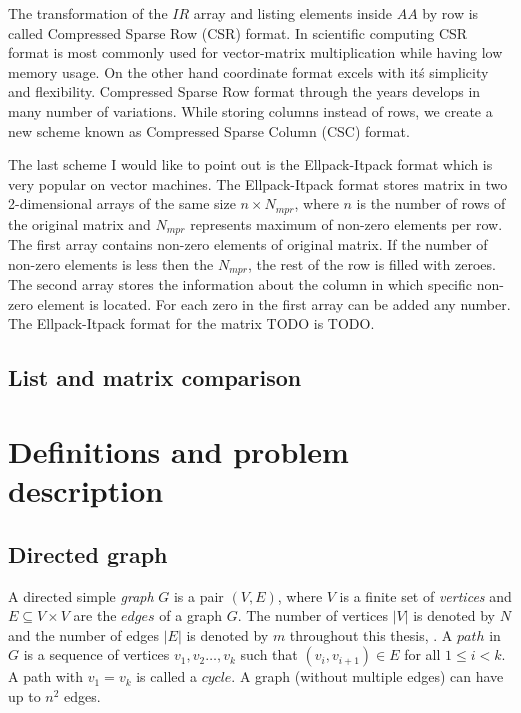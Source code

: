 \documentclass[thesis=M,english]{FITthesis}[2012/10/20]
\begin{document}
The transformation of the $IR$ array and listing elements inside $AA$ by row is called Compressed Sparse Row (CSR) format. In scientific computing CSR format is most commonly used for vector-matrix multiplication while having low memory usage. On the other hand coordinate format excels with it\'s simplicity and flexibility.
Compressed Sparse Row format through the years develops in many number of variations. 
While storing columns instead of rows, we create a new scheme known as Compressed Sparse Column (CSC) format.

The last scheme I would like to point out is the Ellpack-Itpack format which is very popular on vector machines. The Ellpack-Itpack format stores matrix in two 2-dimensional arrays of the same size $n \times N_{mpr}$, where $n$ is the number of rows of the original matrix and $N_{mpr}$ represents maximum of non-zero elements per row. The first array contains non-zero elements of original matrix. If the number of non-zero elements is less then the $N_{mpr}$, the rest of the row is filled with zeroes. The second array stores the information about the column in which specific non-zero element is located. For each zero in the first array can be added any number.
The Ellpack-Itpack format for the matrix TODO is TODO.

\subsection{List and matrix comparison}


\section{Definitions and problem description}

\subsection{Directed graph}
A directed simple \textit{graph} $G$ is a pair $(V, E)$, where $V$ is a finite set of \textit{vertices} and $E \subseteq V \times V$ are the $edges$ of a graph $G$. The number of vertices $|V|$ is denoted by $N$ and the number of edges $|E|$ is denoted by $m$ throughout this thesis, . A $path$ in $G$ is a sequence of vertices $v_1, v_2 \dots ,v_k$ such that $(v_i,v_{i+1}) \in E$ for all $1 \leq i < k$. A path with $v_1 = v_k$ is called a $cycle$. A graph (without multiple edges) can have up to $n^2$ edges. 
\end{document}
